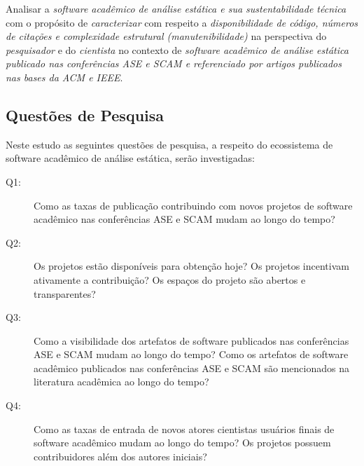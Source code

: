 
Analisar a \textit{software acadêmico de análise estática e sua sustentabilidade técnica} %
com o propósito de \textit{caracterizar}  %
com respeito a \textit{disponibilidade de código, números de citações e complexidade estrutural (manutenibilidade)}  %
na perspectiva do \textit{pesquisador} e do \textit{cientista}%
no contexto de \textit{software acadêmico de análise estática publicado nas conferências ASE e SCAM 
e referenciado por artigos publicados nas bases da ACM e IEEE}. %
%


\subsection{Questões de Pesquisa}

Neste estudo as seguintes questões de pesquisa, a respeito do ecossistema de
software acadêmico de análise estática, serão investigadas:

\newcommand{\QuestaoUm}{Como as taxas de publicação contribuindo com novos projetos de software acadêmico nas conferências ASE e SCAM mudam ao longo do tempo?}
\newcommand{\QuestaoDois}{Os projetos estão disponíveis para obtenção hoje? Os projetos incentivam ativamente a contribuição? Os espaços do projeto são abertos e transparentes?}
\newcommand{\QuestaoTres}{Como a visibilidade dos artefatos de software publicados nas conferências ASE e SCAM mudam ao longo do tempo? Como os artefatos de software acadêmico publicados nas conferências ASE e SCAM são mencionados na literatura acadêmica ao longo do tempo?}
\newcommand{\QuestaoQuatro}{Como as taxas de entrada de novos atores cientistas usuários finais de software acadêmico mudam ao longo do tempo? Os projetos possuem contribuidores além dos autores iniciais?}

\begin{description}
  \item [Q1:] \QuestaoUm
  \item [Q2:] \QuestaoDois
  \item [Q3:] \QuestaoTres
  \item [Q4:] \QuestaoQuatro
\end{description}


